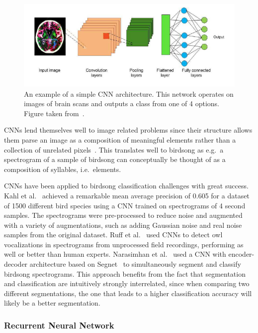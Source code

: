 \begin{figure}[ht]
  \centering
  \includegraphics[width=\textwidth]{figures/cnn_example.png}
  \caption{An example of a simple CNN architecture. This network operates on
  images of brain scans and outputs a class from one of 4 options. Figure taken
from~\cite{sarvamangala2022convolutional}.}\label{fig:cnn_example}
\end{figure}

CNNs lend themselves well to image related problems since their structure
allows them parse an image as a composition of meaningful elements rather than a
collection of unrelated pixels~\cite{lecun2015deep}. This translates well to
birdsong as e.g.\ a spectrogram of a sample of birdsong can conceptually be
thought of as a composition of syllables, i.e.\ elements.

CNNs have been applied to birdsong classification challenges with great success.
Kahl et al.~\cite{kahl2017large} achieved a remarkable mean average precision of
0.605 for a dataset of 1500 different bird species using a CNN trained on
spectrograms of 4 second samples. The spectrograms were pre-processed to reduce
noise and augmented with a variety of augmentations, such as adding Gaussian
noise and real noise samples from the original dataset. Ruff et
al.~\cite{ruff2020automated} used CNNs to detect owl vocalizations in
spectrograms from unprocessed field recordings, performing as well or better
than human experts. Narasimhan et al.~\cite{narasimhan2017simultaneous} used a
CNN with encoder-decoder architecture based on
Segnet~\cite{badrinarayanan2017segnet} to simultaneously segment and classify
birdsong spectrograms. This approach benefits from the fact that segmentation
and classification are intuitively strongly interrelated, since when comparing
two different segmentations, the one that leads to a higher classification
accuracy will likely be a better segmentation.

\subsubsection{Recurrent Neural Network}

